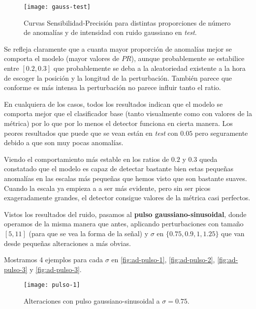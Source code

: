 \begin{figure}[htpb]
  \centering
  \texttt{[image: gauss-test]}
  \caption{Curvas Sensibilidad-Precisión para distintas proporciones de número de anomalías y de intensidad con ruido gaussiano en \emph{test}.}
  \label{fig:ad-gauss-test}
\end{figure}

Se refleja claramente que a cuanta mayor proporción de anomalías mejor se comporta el modelo (mayor valores de $PR$), aunque probablemente se estabilice entre $[0.2, 0.3]$ que probablemente se deba a la aleatoriedad existente a la hora de escoger la posición y la longitud de la perturbación. También parece que conforme es más intensa la perturbación no parece influir tanto el ratio.

En cualquiera de los casos, todos los resultados indican que el modelo se comporta mejor que el clasificador base (tanto visualmente como con valores de la métrica) por lo que por lo menos el detector funciona en cierta manera. Los peores resultados que puede que se vean están en \emph{test} con $0.05$ pero seguramente debido a que son muy pocas anomalías.

Viendo el comportamiento más estable en los ratios de $0.2$ y $0.3$ queda constatado que el modelo es capaz de detectar bastante bien estas pequeñas anomalías en las escalas más pequeñas que hemos visto que son bastante suaves. Cuando la escala ya empieza a a ser más evidente, pero sin ser picos exageradamente grandes, el detector consigue valores de la métrica casi perfectos.

Vistos los resultados del ruido, pasamos al \textbf{pulso gaussiano-sinusoidal}, donde operamos de la misma manera que antes, aplicando perturbaciones con tamaño $[5, 11]$ (para que se vea la forma de la señal) y $\sigma$ en $\{0.75, 0.9, 1, 1.25\}$ que van desde pequeñas alteraciones a más obvias.

Mostramos 4 ejemplos para cada $\sigma$ en \autoref{fig:ad-pulso-1}, \autoref{fig:ad-pulso-2}, \autoref{fig:ad-pulso-3} y \autoref{fig:ad-pulso-3}.

\begin{figure}[htpb]
  \centering
  \texttt{[image: pulso-1]}
  \caption{Alteraciones con pulso gaussiano-sinusoidal a $\sigma = 0.75$.}
  \label{fig:ad-pulso-1}
\end{figure}

